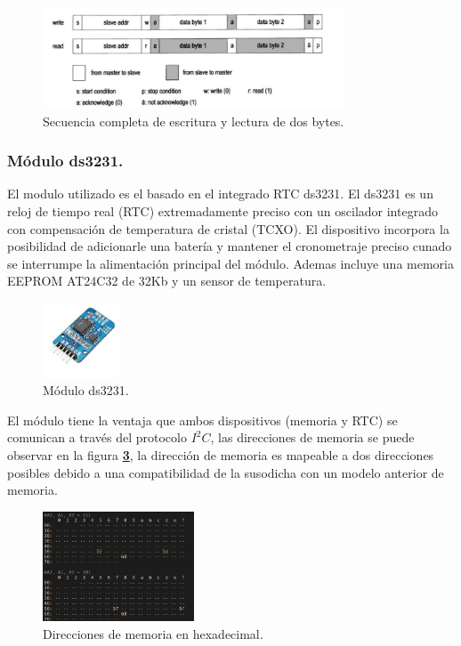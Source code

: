 \documentclass[11pt, a4paper]{article}
\begin{document}
		\begin{figure}[H]
			\centering
			\includegraphics[width=0.8\textwidth]{Imagenes/read-write-op.png}
			\caption{Secuencia completa de escritura y lectura de dos bytes.}
			\label{fig:read-write-op}
		\end{figure} 
	

		\subsubsection{Módulo ds3231.}
			El modulo utilizado es el basado en el integrado RTC ds3231. El ds3231 es un reloj de tiempo real (RTC) extremadamente preciso con un oscilador integrado con compensación de temperatura de cristal (TCXO). El dispositivo incorpora la posibilidad de adicionarle una batería y mantener el cronometraje preciso cunado se interrumpe la alimentación principal del módulo. Ademas incluye una memoria EEPROM AT24C32 de 32Kb y un sensor de temperatura.  

		\begin{figure}[H]
			\centering
			\includegraphics[width=0.2\textwidth]{Imagenes/ds3231.png}
			\caption{Módulo ds3231.}
			\label{fig:basic_timing}
		\end{figure} 

		El módulo tiene la ventaja que ambos dispositivos (memoria y RTC) se comunican a través del protocolo $I^{2}C$, las direcciones de memoria se puede observar en la figura \textcolor{blue}{\textbf{\ref{fig:slave_add}}}, la dirección de memoria es mapeable a dos direcciones posibles debido a una compatibilidad de la susodicha con un modelo anterior de memoria. 

		\begin{figure}[H]
			\centering
			\includegraphics[width=0.4\textwidth]{Imagenes/slave-add.png}
			\caption{Direcciones de memoria en hexadecimal.}
			\label{fig:slave_add}
		\end{figure} 
\end{document}
